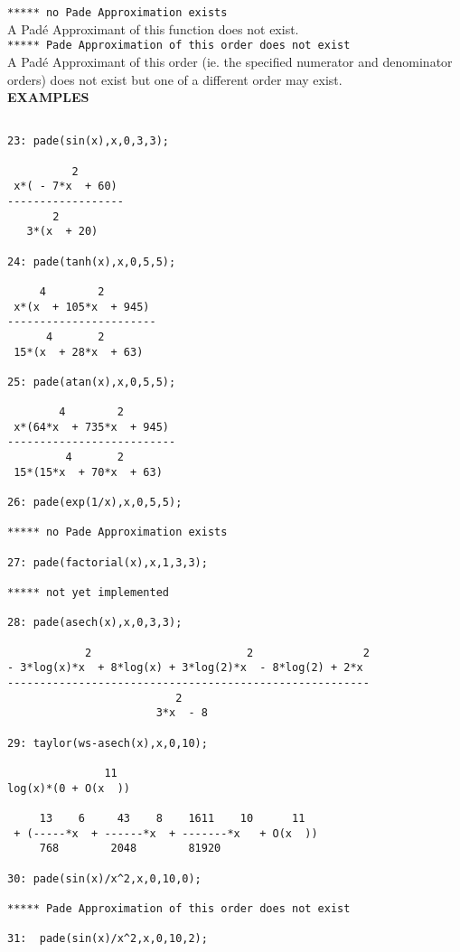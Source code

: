 \texttt{***** no Pade Approximation exists}\\

A Pad\'{e} Approximant of this function does not exist.\\[\baselineskip]

\newpage
\texttt{***** Pade Approximation of this order does not exist}\\

A Pad\'{e} Approximant of this order (ie. the specified
numerator and denominator orders) does not exist but one
of a different order may exist.\\[\baselineskip]


\large{\textbf{EXAMPLES}}

\begin{verbatim}

23: pade(sin(x),x,0,3,3);

          2
 x*( - 7*x  + 60)
------------------
       2
   3*(x  + 20)

24: pade(tanh(x),x,0,5,5);

     4        2
 x*(x  + 105*x  + 945)
-----------------------
      4       2
 15*(x  + 28*x  + 63)

25: pade(atan(x),x,0,5,5);

        4        2
 x*(64*x  + 735*x  + 945)
--------------------------
         4       2
 15*(15*x  + 70*x  + 63)

26: pade(exp(1/x),x,0,5,5);

***** no Pade Approximation exists

27: pade(factorial(x),x,1,3,3);

***** not yet implemented

28: pade(asech(x),x,0,3,3);

            2                        2                 2
- 3*log(x)*x  + 8*log(x) + 3*log(2)*x  - 8*log(2) + 2*x
--------------------------------------------------------
                          2
                       3*x  - 8

29: taylor(ws-asech(x),x,0,10);

               11  
log(x)*(0 + O(x  ))

     13    6     43    8    1611    10      11
 + (-----*x  + ------*x  + -------*x   + O(x  ))
     768        2048        81920

30: pade(sin(x)/x^2,x,0,10,0);

***** Pade Approximation of this order does not exist

31:  pade(sin(x)/x^2,x,0,10,2);


\end{verbatim}
